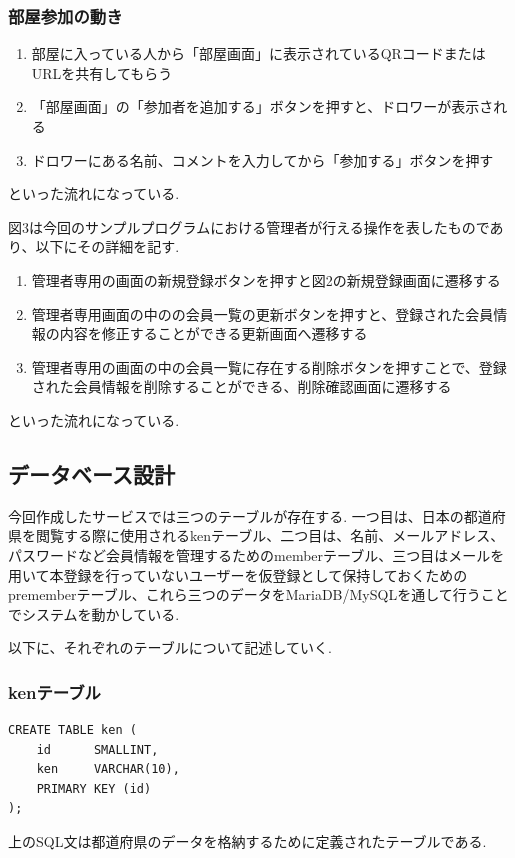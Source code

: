 \documentclass[submit,techrep]{ipsj}
\begin{document}
\subsubsection{部屋参加の動き}
\begin{enumerate}
  \item 部屋に入っている人から「部屋画面」に表示されているQRコードまたはURLを共有してもらう
  \item 「部屋画面」の「参加者を追加する」ボタンを押すと、ドロワーが表示される
  \item  ドロワーにある名前、コメントを入力してから「参加する」ボタンを押す

 \end{enumerate}
といった流れになっている.


図3は今回のサンプルプログラムにおける管理者が行える操作を表したものであり、以下にその詳細を記す.

\begin{enumerate}
  \item 管理者専用の画面の新規登録ボタンを押すと図2の新規登録画面に遷移する
  \item 管理者専用画面の中のの会員一覧の更新ボタンを押すと、登録された会員情報の内容を修正することができる更新画面へ遷移する
  \item  管理者専用の画面の中の会員一覧に存在する削除ボタンを押すことで、登録された会員情報を削除することができる、削除確認画面に遷移する
  \end{enumerate}
といった流れになっている.

\subsection{データベース設計}
今回作成したサービスでは三つのテーブルが存在する.
一つ目は、日本の都道府県を閲覧する際に使用されるkenテーブル、二つ目は、名前、メールアドレス、パスワードなど会員情報を管理するためのmemberテーブル、三つ目はメールを用いて本登録を行っていないユーザーを仮登録として保持しておくためのprememberテーブル、これら三つのデータをMariaDB/MySQLを通して行うことでシステムを動かしている.

以下に、それぞれのテーブルについて記述していく.

\subsubsection{kenテーブル}
\begin{verbatim}
CREATE TABLE ken (
    id      SMALLINT,
    ken     VARCHAR(10),
    PRIMARY KEY (id)
);
\end{verbatim}
上のSQL文は都道府県のデータを格納するために定義されたテーブルである.
\end{document}

